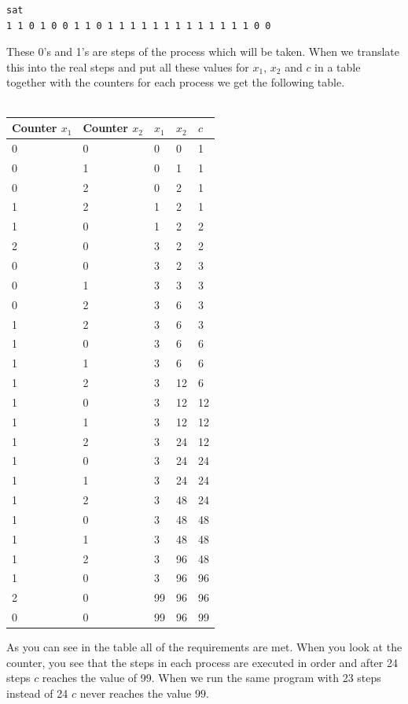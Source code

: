 \documentclass[12pt]{article}
\begin{document}
{\footnotesize
\begin{verbatim}
sat 
1 1 0 1 0 0 1 1 0 1 1 1 1 1 1 1 1 1 1 1 1 1 0 0
\end{verbatim}

\noindent These 0's and 1's are steps of the process which will be taken. When we translate this into the real steps and put all these values for $x_1$, $x_2$ and $c$ in a table together with the counters for each process we get the following table.\\
\\
\begin{center}
\begin{tabular}{| l | l | l | l | l |}
\hline
Counter $x_1$	& Counter $x_2$	& $x_1$	& $x_2$	& $c$	\\
\hline
0 	& 0	&	0	&	0	&	1	\\
0 	& 1	&	0	&	1	&	1	\\
0	& 2	&	0	&	2	&	1	\\
1 	& 2	&	1	&	2	&	1	\\
1 	& 0	&	1	&	2	&	2	\\
2	& 0	&	3	&	2	&	2	\\
0 	& 0	&	3	&	2	&	3	\\
0 	& 1	&	3	&	3	&	3	\\
0	& 2	&	3	&	6	&	3	\\
1 	& 2	&	3	&	6	&	3	\\
1 	& 0	&	3	&	6	&	6	\\
1	& 1	&	3	&	6	&	6	\\
1 	& 2	&	3	&	12	&	6	\\
1 	& 0	&	3	&	12	&	12	\\
1 	& 1	&	3	&	12	&	12	\\
1	& 2	&	3	&	24	&	12	\\
1 	& 0	&	3	&	24	&	24	\\
1 	& 1	&	3	&	24	&	24	\\
1 	& 2	&	3	&	48	&	24	\\
1 	& 0	&	3	&	48	&	48	\\
1	& 1	&	3	&	48	&	48	\\
1	& 2	&	3	&	96	&	48	\\
1	& 0	&	3	&	96	&	96	\\
2 	& 0	&	99	&	96	&	96	\\
0 	& 0	&	99	&	96	&	99	\\
\hline
\end{tabular}
\end{center}
\vspace{3mm}

\noindent As you can see in the table all of the requirements are met. When you look at the counter, you see that the steps in each process are executed in order and  after 24 steps $c$ reaches the value of 99. When we run the same program with 23 steps instead of 24 $c$ never reaches the value $99$.

}
\end{document}
